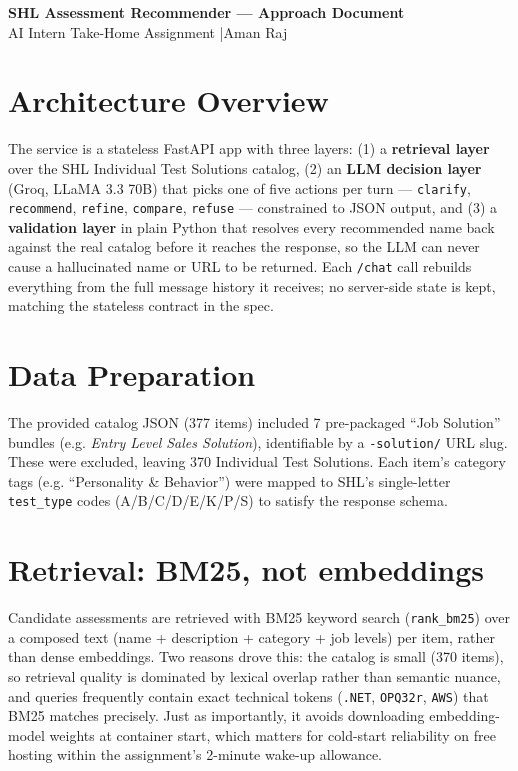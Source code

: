 \documentclass[10pt]{article}
\begin{document}
\begin{center}
{\LARGE\bfseries SHL Assessment Recommender --- Approach Document}\\[4pt]
{\small AI Intern Take-Home Assignment \quad|\quad Aman Raj}
\end{center}
\vspace{4pt}

\section{Architecture Overview}
The service is a stateless FastAPI app with three layers: (1) a \textbf{retrieval layer} over the SHL Individual Test Solutions catalog, (2) an \textbf{LLM decision layer} (Groq, LLaMA 3.3 70B) that picks one of five actions per turn --- \texttt{clarify}, \texttt{recommend}, \texttt{refine}, \texttt{compare}, \texttt{refuse} --- constrained to JSON output, and (3) a \textbf{validation layer} in plain Python that resolves every recommended name back against the real catalog before it reaches the response, so the LLM can never cause a hallucinated name or URL to be returned. Each \texttt{/chat} call rebuilds everything from the full message history it receives; no server-side state is kept, matching the stateless contract in the spec.

\section{Data Preparation}
The provided catalog JSON (377 items) included 7 pre-packaged ``Job Solution'' bundles (e.g. \textit{Entry Level Sales Solution}), identifiable by a \texttt{-solution/} URL slug. These were excluded, leaving 370 Individual Test Solutions. Each item's category tags (e.g. ``Personality \& Behavior'') were mapped to SHL's single-letter \texttt{test\_type} codes (A/B/C/D/E/K/P/S) to satisfy the response schema.

\section{Retrieval: BM25, not embeddings}
Candidate assessments are retrieved with BM25 keyword search (\texttt{rank\_bm25}) over a composed text (name + description + category + job levels) per item, rather than dense embeddings. Two reasons drove this: the catalog is small (370 items), so retrieval quality is dominated by lexical overlap rather than semantic nuance, and queries frequently contain exact technical tokens (\texttt{.NET}, \texttt{OPQ32r}, \texttt{AWS}) that BM25 matches precisely. Just as importantly, it avoids downloading embedding-model weights at container start, which matters for cold-start reliability on free hosting within the assignment's 2-minute wake-up allowance.
\end{document}
